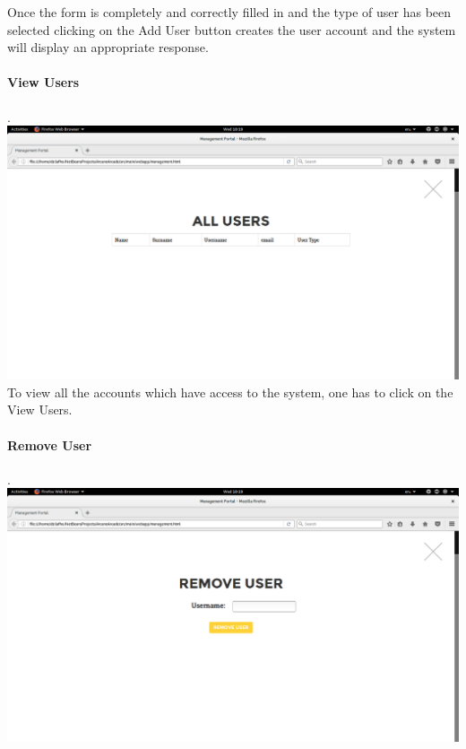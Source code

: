 \documentclass[english]{article}
\begin{document}
Once the form is completely and correctly filled in and the type of user has been selected clicking on the Add User button creates the user account and the system will display an appropriate response.
				\\[10pt]
				
				\paragraph{View Users}. \\ \newline
				\includegraphics[width=\linewidth]{ViewUsers.png}				\newline
					To view all the accounts which have access to the system, one has to click on the View Users.\newline
				
				\paragraph{Remove User}. \\ \newline
				\includegraphics[width=\linewidth]{RemoveUser.png}				\newline
\end{document}
